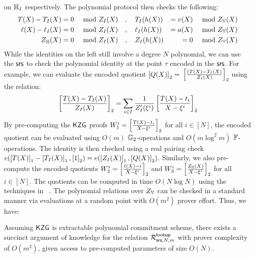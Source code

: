 on $\mathbb{H}_I$ respectively. The polynomial protocol then checks the following:
\begin{alignat}{3}\label{eq:poly-comm-index}
T(X) - T_I(X) &= 0 \quad \text{ mod } Z_I(X) &&,\quad T_I(h(X)) &= v(X) \quad \text{ mod } Z_{\mathbb{V}}(X) \\
\ell(X) - \ell_I(X) &= 0 \quad \text{ mod } Z_I(X) &&,\quad \ell_I(h(X)) &= a(X) \quad \text{ mod } Z_{\mathbb{V}}(X) \\
Z_{\mathbb{H}}(X) &= 0 \quad \text{ mod } Z_I(X) &&,\quad Z_I(h(X)) &= 0 \quad \text{ mod } Z_{\mathbb{V}}(X)
\end{alignat}
While the identities on the left still involve a degree $N$ polynomial, we can use the $\mathsf{srs}$ to check the polynomial
identity at the point $\tau$ encoded in the $\mathsf{srs}$. For example, we can evaluate the encoded quotient $\left[{Q(X)}\right]_2 =$
$\left[{\frac{(T(X) - T_I(X)}{Z_I(X)}}\right]_2$ using the relation:
\begin{equation*}
\left[{\frac{T(X)-T_I(X)}{Z_I(X)}}\right]_2 = \sum_{i\in I}\frac{1}{Z_I'(\xi^i)}\left[{\frac{T(X)-t_i}{X-\xi^i}}\right]_2
\end{equation*}
By pre-computing the $\mathsf{KZG}$ proofs $W_1^i=\left[{\frac{T(X)-t_i}{X-\xi^i}}\right]_2$ for all $i\in [N]$, the encoded quotient can be
evaluated using $O(m)$ $\mathbb{G}_2$-operations and $O(m\log^2 m)$ $\mathbb{F}$-operations. The identity is then checked using a real
pairing check $e(\left[{T(X)}\right]_1-\left[{T_I(X)}\right]_1,\left[{1}\right]_2)=e(\left[{Z_I(X)}\right]_1,\left[{Q(X)}\right]_2)$.
Similarly, we also pre-compute the encoded
quotients $W_2^i=\left[{\frac{\ell(X) - i}{X-\xi^i}}\right]_2$ and $W_3^i=\left[{\frac{Z_\mathbb{H}(X)}{X-\xi^i}}\right]_2$ for all $i\in [N]$.
The quotients can be computed in time $O(N\log N)$ using the techniques in ~\cite{EPRINT:FeiKho23}.
The polynomial relations over $Z_{\mathbb{V}}$ can be checked in a standard manner via evaluations at a random point with $O(m^2)$ prover effort.
Thus, we have:
\begin{lemma}\label{lem:comm-index-lookup}
Assuming $\mathsf{KZG}$ is extractable polynomial commitment scheme, there exists a succinct argument of knowledge for
the relation $\mathcal{R}^{\mathsf{lookup}}_{\mathsf{srs},N,m}$ with prover complexity of $O(m^2)$, given access to pre-computed parameters of size $O(N)$.
\end{lemma}

